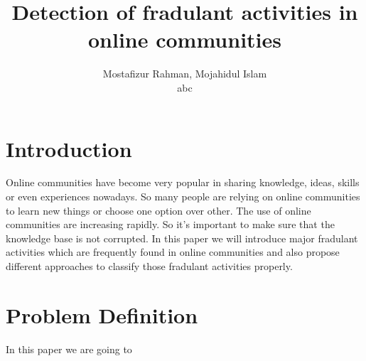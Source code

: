 \documentclass[11pt,twoside,a4paper]{article}
\begin{document}
\title{Detection of fradulant activities in online communities}
\author{Mostafizur Rahman, Mojahidul Islam \\ abc}
\maketitle

\section{Introduction}
Online communities have become very popular in sharing knowledge, ideas, skills or even experiences nowadays. So many people are relying on online communities to learn new things or choose one option over other. The use of online communities are increasing rapidly. So it's important to make sure that the knowledge base is not corrupted. In this paper we will introduce major fradulant activities which are frequently found in online communities and also propose different approaches to classify those fradulant activities properly. 

\section{Problem Definition}
In this paper we are going to 
\end{document}
